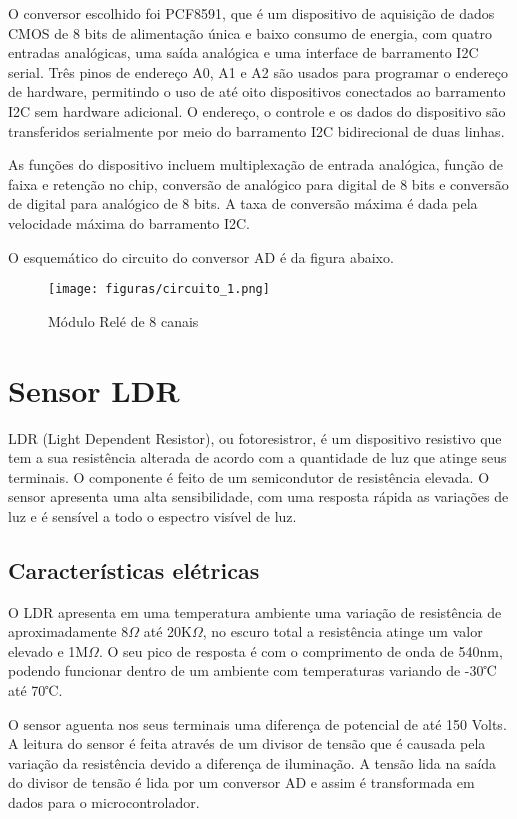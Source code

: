 O conversor escolhido foi PCF8591, que é um dispositivo de aquisição de dados CMOS de 8 bits de alimentação única e baixo consumo de energia, com quatro entradas analógicas, uma saída analógica e uma interface de barramento I2C serial. Três pinos de endereço A0, A1 e A2 são usados para programar o endereço de hardware, permitindo o uso de até oito dispositivos conectados ao barramento I2C sem hardware adicional. O endereço, o controle e os dados do dispositivo são transferidos serialmente por meio do barramento I2C bidirecional de duas linhas\cite{nxp2013}.

As funções do dispositivo incluem multiplexação de entrada analógica, função de faixa e retenção no chip, conversão de analógico para digital de 8 bits e conversão de digital para analógico de 8 bits. A taxa de conversão máxima é dada pela velocidade máxima do barramento I2C\cite{nxp2013}.

O esquemático do circuito do conversor AD é da figura abaixo.

\begin{figure}[H]
	\centering
	\texttt{[image: figuras/circuito\_1.png]}
	\caption{Módulo Relé de 8 canais} \label{circuito_1}
\end{figure}


\section{Sensor LDR}

LDR (Light Dependent Resistor), ou fotoresistror, é um dispositivo resistivo que tem a sua resistência alterada de acordo com a quantidade de luz que atinge seus terminais. O componente é feito de um semicondutor de resistência elevada. O sensor apresenta uma alta sensibilidade, com uma resposta rápida as variações de luz e é sensível a todo o espectro visível de luz\cite{ahmad2016}.

\subsection{Características elétricas}

O LDR apresenta em uma temperatura ambiente uma variação de resistência de aproximadamente 8$\Omega$ até 20K$\Omega$, no escuro total a resistência atinge um valor elevado e 1M$\Omega$. O seu pico de resposta é com o comprimento de onda de 540nm, podendo funcionar dentro de um ambiente com temperaturas variando de -30℃ até 70℃\cite{ahmad2016}.

O sensor aguenta nos seus terminais uma diferença de potencial de até 150 Volts. A leitura do sensor é feita através de um divisor de tensão que é causada pela variação da resistência devido a diferença de iluminação. A tensão lida na saída do divisor de tensão é lida por um conversor AD e assim é transformada em dados para o microcontrolador\cite{ahmad2016}.

